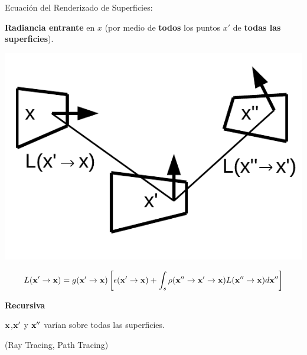 \documentclass[spanish,unknownkeysallowed,10pt]{beamer}
\begin{document}
\begin{frame}{Ecuación del Renderizado de Superficies:}

\textbf{Radiancia entrante} en $x$ (por medio de \textbf{todos} los puntos $x'$ de \textbf{todas las superficies}).

\centerline{\includegraphics[scale = 0.4]{../figures/rendequation}}
\vspace{-1cm}
$$ L(\bold{x'} \rightarrow \bold{x}) =  g(\bold{x'}  \rightarrow \bold{x})  \left[ \epsilon(\bold{x'}  \rightarrow \bold{x}) + \int_{s}{\rho(\bold{x''}  \rightarrow \bold{x'}  \rightarrow \bold{x})L(\bold{x''}  \rightarrow \bold{x}) d\bold{x''}} \right] $$

\textbf{Recursiva}

$\bold{x}$,$\bold{x'}$ y $\bold{x''}$ varían sobre todas las superficies.

(Ray Tracing, Path Tracing)

\end{frame}


\end{document}
